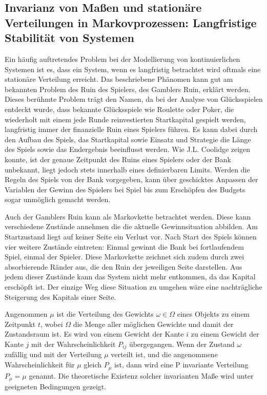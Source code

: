 \subsection{Invarianz von Maßen und stationäre Verteilungen in Markovprozessen: Langfristige Stabilität von Systemen}

Ein häufig auftretendes Problem bei der Modellierung von kontinuierlichen Systemen ist es, dass ein System, wenn es langfristig betrachtet wird oftmals eine stationäre Verteilung erreicht. Das beschriebene Phänomen kann gut am bekannten Problem des Ruin des Spielers, des Gamblers Ruin, erklärt werden. Dieses berühmte Problem trägt den Namen, da bei der Analyse von Glücksspielen entdeckt wurde, dass bekannte Glücksspiele wie Roulette oder Poker, die wiederholt mit einem jede Runde reinvestierten Startkapital gespielt werden, langfristig immer der finanzielle Ruin eines Spielers führen. Es kann dabei durch den Aufbau des Spiels, das Startkapital sowie Einsatz und Strategie die Länge des Spiels sowie das Endergebnis beeinflusst werden. Wie J.L. Coolidge zeigen konnte, ist der genaue Zeitpunkt des Ruins eines Spielers oder der Bank unbekannt, liegt jedoch stets innerhalb eines definierbaren Limits. Werden die Regeln des Spiels von der Bank vorgegeben, kann über geschicktes Anpassen der Variablen der Gewinn des Spielers bei Spiel bis zum Erschöpfen des Budgets sogar unmöglich gemacht werden. \citep{coolidge1909gamblers}

Auch der Gamblers Ruin kann als Markovkette betrachtet werden. Diese kann verschiedene Zustände annehmen die die aktuelle Gewinnsituation abbilden. Am Startzustand liegt auf keiner Seite ein Verlust vor. Nach Start des Spiels können vier weitere Zustände eintreten: Einmal gewinnt die Bank bei fortlaufendem Spiel, einmal der Spieler. Diese Markovkette zeichnet sich zudem durch zwei absorbierende Ränder aus, die den Ruin der jeweiligen Seite darstellen. Aus jedem dieser Zustände kann das System nicht mehr entkommen, da das Kapital erschöpft ist. Der einzige Weg diese Situation zu umgehen wäre eine nachträgliche Steigerung des Kapitals einer Seite.

Angenommen $\mu$ ist die Verteilung des Gewichts $\omega \in \Omega$ eines Objekts zu einem Zeitpunkt $t$, wobei $\Omega$ die Menge aller möglichen Gewichte und damit der Zustandsraum ist. Es wird von einem Gewicht der Kante $i$ zu einem Gewicht der Kante $j$ mit der Wahrscheinlichkeit $P_{ij}$ übergegangen. Wenn der Zustand $\omega$ zufällig und mit der Verteilung $\mu$ verteilt ist, und die angenommene Wahrscheinlichkeit für $\mu$ gleich $P_\mu$ ist, dann wird eine P invariante Verteilung $P_\mu = \mu$ genannt. Die theoretische Existenz solcher invarianten Maße wird unter geeigneten Bedingungen gezeigt. \citep{Lester1966}

